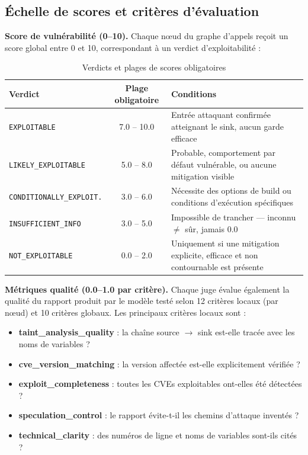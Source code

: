 \documentclass[a4paper, 12pt, hidelinks]{article}
\begin{document}
\subsection*{Échelle de scores et critères d'évaluation}

\textbf{Score de vulnérabilité (0--10).} Chaque nœud du graphe d'appels reçoit un score global entre 0 et 10, correspondant à un verdict d'exploitabilité :

\begin{table}[H]
  \centering
  \begin{tabularx}{\textwidth}{l c X}
    \toprule
    \textbf{Verdict} & \textbf{Plage obligatoire} & \textbf{Conditions} \\
    \midrule
    \texttt{EXPLOITABLE}              & 7.0 -- 10.0 & Entrée attaquant confirmée atteignant le sink, aucun garde efficace \\
    \texttt{LIKELY\_EXPLOITABLE}      & 5.0 -- 8.0  & Probable, comportement par défaut vulnérable, ou aucune mitigation visible \\
    \texttt{CONDITIONALLY\_EXPLOIT.}  & 3.0 -- 6.0  & Nécessite des options de build ou conditions d'exécution spécifiques \\
    \texttt{INSUFFICIENT\_INFO}       & 3.0 -- 5.0  & Impossible de trancher --- inconnu $\neq$ sûr, jamais 0.0 \\
    \texttt{NOT\_EXPLOITABLE}         & 0.0 -- 2.0  & Uniquement si une mitigation explicite, efficace et non contournable est présente \\
    \bottomrule
  \end{tabularx}
  \caption{Verdicts et plages de scores obligatoires}
\end{table}

\textbf{Métriques qualité (0.0--1.0 par critère).} Chaque juge évalue également la qualité du rapport produit par le modèle testé selon 12 critères locaux (par nœud) et 10 critères globaux. Les principaux critères locaux sont :

\begin{itemize}
  \item \textbf{taint\_analysis\_quality} : la chaîne source $\rightarrow$ sink est-elle tracée avec les noms de variables ?
  \item \textbf{cve\_version\_matching} : la version affectée est-elle explicitement vérifiée ?
  \item \textbf{exploit\_completeness} : toutes les CVEs exploitables ont-elles été détectées ?
  \item \textbf{speculation\_control} : le rapport évite-t-il les chemins d'attaque inventés ?
  \item \textbf{technical\_clarity} : des numéros de ligne et noms de variables sont-ils cités ?
\end{itemize}
\end{document}
